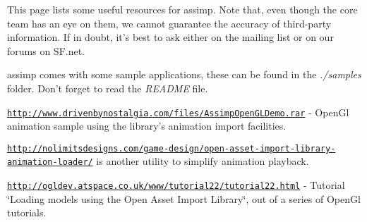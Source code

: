 This page lists some useful resources for assimp. Note that, even though the core team has an eye on them, we cannot guarantee the accuracy of third-\/party information. If in doubt, it's best to ask either on the mailing list or on our forums on S\+F.\+net.


\begin{DoxyItemize}
\item assimp comes with some sample applications, these can be found in the {\itshape ./samples} folder. Don't forget to read the {\itshape R\+E\+A\+D\+M\+E} file.
\item \href{http://www.drivenbynostalgia.com/files/AssimpOpenGLDemo.rar}{\tt http\+://www.\+drivenbynostalgia.\+com/files/\+Assimp\+Open\+G\+L\+Demo.\+rar} -\/ Open\+Gl animation sample using the library's animation import facilities.
\item \href{http://nolimitsdesigns.com/game-design/open-asset-import-library-animation-loader/}{\tt http\+://nolimitsdesigns.\+com/game-\/design/open-\/asset-\/import-\/library-\/animation-\/loader/} is another utility to simplify animation playback.
\item \href{http://ogldev.atspace.co.uk/www/tutorial22/tutorial22.html}{\tt http\+://ogldev.\+atspace.\+co.\+uk/www/tutorial22/tutorial22.\+html} -\/ Tutorial \char`\"{}\+Loading models using the Open Asset Import Library\char`\"{}, out of a series of Open\+Gl tutorials. 
\end{DoxyItemize}